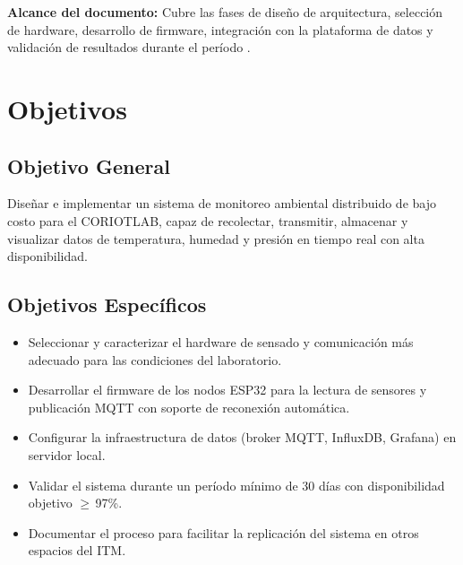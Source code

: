 \documentclass[12pt, letterpaper]{article}
\begin{document}
\begin{tcolorbox}[cajaDatos]
  \textbf{Alcance del documento:} Cubre las fases de diseño de arquitectura, selección de hardware, desarrollo de firmware, integración con la plataforma de datos y validación de resultados durante el período \DocPeriodo.
\end{tcolorbox}

\section{Objetivos}

\subsection{Objetivo General}

Diseñar e implementar un sistema de monitoreo ambiental distribuido de bajo costo para el CORIOTLAB, capaz de recolectar, transmitir, almacenar y visualizar datos de temperatura, humedad y presión en tiempo real con alta disponibilidad.

\subsection{Objetivos Específicos}

\begin{itemize}[label={\color{AzulITM}\textbf{>}}, leftmargin=1.8em, itemsep=5pt]
  \item Seleccionar y caracterizar el hardware de sensado y comunicación más adecuado para las condiciones del laboratorio.
  \item Desarrollar el firmware de los nodos ESP32 para la lectura de sensores y publicación MQTT con soporte de reconexión automática.
  \item Configurar la infraestructura de datos (broker MQTT, InfluxDB, Grafana) en servidor local.
  \item Validar el sistema durante un período mínimo de 30 días con disponibilidad objetivo $\geq$\,97\%.
  \item Documentar el proceso para facilitar la replicación del sistema en otros espacios del ITM.
\end{itemize}

\end{document}
